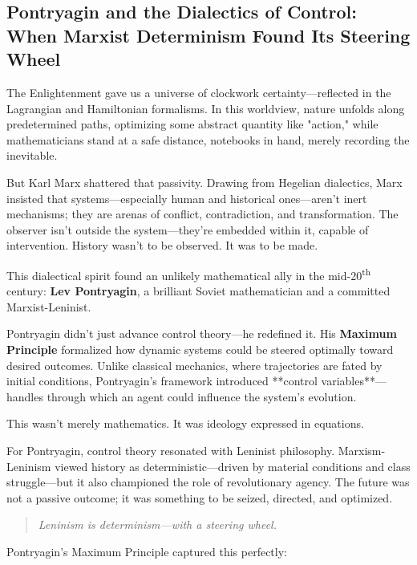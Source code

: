 \subsection{Pontryagin and the Dialectics of Control:  
When Marxist Determinism Found Its Steering Wheel}

The Enlightenment gave us a universe of clockwork certainty—reflected in the Lagrangian and Hamiltonian formalisms. In this worldview, nature unfolds along predetermined paths, optimizing some abstract quantity like "action," while mathematicians stand at a safe distance, notebooks in hand, merely recording the inevitable.

But Karl Marx shattered that passivity. Drawing from Hegelian dialectics, Marx insisted that systems—especially human and historical ones—aren’t inert mechanisms; they are arenas of conflict, contradiction, and transformation. The observer isn’t outside the system—they’re embedded within it, capable of intervention. History wasn’t to be observed. It was to be made.

\medskip

This dialectical spirit found an unlikely mathematical ally in the mid-20\textsuperscript{th} century:  
\textbf{Lev Pontryagin}, a brilliant Soviet mathematician and a committed Marxist-Leninist.

Pontryagin didn’t just advance control theory—he redefined it. His \textbf{Maximum Principle} formalized how dynamic systems could be steered optimally toward desired outcomes. Unlike classical mechanics, where trajectories are fated by initial conditions, Pontryagin’s framework introduced **control variables**—handles through which an agent could influence the system’s evolution.

\medskip

This wasn’t merely mathematics. It was ideology expressed in equations.

For Pontryagin, control theory resonated with Leninist philosophy. Marxism-Leninism viewed history as deterministic—driven by material conditions and class struggle—but it also championed the role of revolutionary agency. The future was not a passive outcome; it was something to be seized, directed, and optimized.

\begin{quote}
\textit{Leninism is determinism—with a steering wheel.}
\end{quote}

Pontryagin’s Maximum Principle captured this perfectly:

